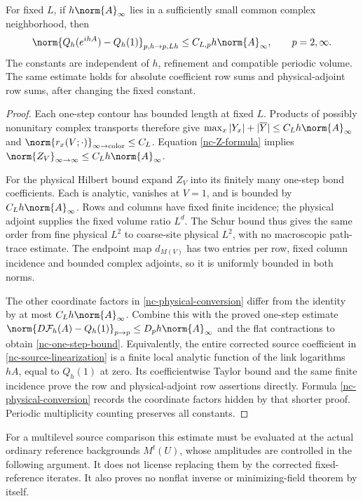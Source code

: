 \begin{proposition}
\label{nc-one-step-proposition}
For fixed $L$, if $h\norm{A}_\infty$ lies in a sufficiently small
common complex neighborhood, then
\begin{equation}
 \norm{Q_h(e^{ihA})-Q_h(1)}_{p,h\to p,Lh}
     \le C_{L,p}h\norm{A}_\infty,
 \qquad p=2,\infty.
 \label{nc-one-step-bound}
\end{equation}
The constants are independent of $h$, refinement and compatible
periodic volume. The same estimate holds for absolute coefficient
row sums and physical-adjoint row sums, after changing the fixed
constant.
\end{proposition}

\begin{proof}
Each one-step contour has bounded length at fixed $L$. Products of
possibly nonunitary complex transports therefore give
$\max_x|Y_x|+|\overline Y|\le C_Lh\norm{A}_\infty$ and
$\norm{r_x(V;\cdot)}_{\infty\to\mathrm{color}}\le C_L$.
Equation \eqref{nc-Z-formula} implies
$\norm{Z_V}_{\infty\to\infty}\le C_Lh\norm{A}_\infty$.

For the physical Hilbert bound expand $Z_V$ into its finitely many
one-step bond coefficients. Each is analytic, vanishes at $V=1$,
and is bounded by $C_Lh\norm{A}_\infty$. Rows and columns have
fixed finite incidence; the physical adjoint supplies the fixed
volume ratio $L^d$. The Schur bound thus gives the same order
from fine physical $L^2$ to coarse-site physical $L^2$, with no
macroscopic path-trace estimate. The endpoint map $d_{M(V)}$ has
two entries per row, fixed column incidence and bounded complex
adjoints, so it is uniformly bounded in both norms.

The other coordinate factors in \eqref{nc-physical-conversion}
differ from the identity by at most $C_Lh\norm{A}_\infty$.
Combine this with the proved one-step estimate
$\norm{D\mathcal F_h(A)-Q_h(1)}_{p\to p}
\le D_ph\norm{A}_\infty$ and the flat contractions to obtain
\eqref{nc-one-step-bound}. Equivalently, the entire corrected
source coefficient in \eqref{nc-source-linearization} is a finite
local analytic function of the link logarithms $hA$, equal to
$Q_h(1)$ at zero. Its coefficientwise Taylor bound and the same
finite incidence prove the row and physical-adjoint row assertions
directly. Formula \eqref{nc-physical-conversion} records the
coordinate factors hidden by that shorter proof. Periodic
multiplicity counting preserves all constants.
\end{proof}

For a multilevel source comparison this estimate must be evaluated
at the actual ordinary reference backgrounds $M^t(U)$, whose
amplitudes are controlled in the following argument. It does not
license replacing them by the corrected fixed-reference iterates.
It also proves no nonflat inverse or minimizing-field theorem by
itself.
